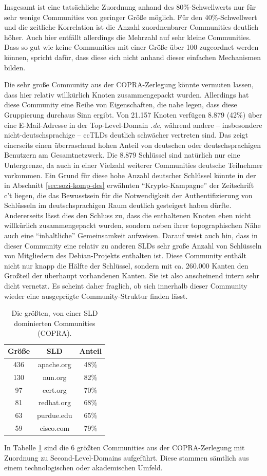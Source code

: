 Insgesamt ist eine tatsächliche Zuordnung anhand des
80\%-Schwellwerts nur für sehr wenige Communities von geringer
Größe möglich. Für den 40\%-Schwellwert und die zeitliche
Korrelation ist die Anzahl zuordnenbarer Communities deutlich
höher. Auch hier entfällt allerdings die Mehrzahl auf sehr kleine
Communities.  Dass so gut wie keine Communities mit einer Größe
über 100 zugeordnet werden können, spricht dafür, dass diese
sich nicht anhand dieser einfachen Mechanismen bilden.

Die sehr große Community aus der COPRA-Zerlegung könnte vermuten
lassen, dass hier relativ willkürlich Knoten zusammengepackt
wurden. Allerdings hat diese Community eine Reihe von Eigenschaften,
die nahe legen, dass diese Gruppierung durchaus Sinn ergibt. Von 21.157
Knoten verfügen 8.879 (42\%) über eine E-Mail-Adresse in der
Top-Level-Domain \emph{.de}, während andere -- insbesondere
nicht-deutschsprachige -- ccTLDs deutlich schwächer vertreten
sind. Das zeigt einerseits einen überraschend hohen Anteil von
deutschen oder deutschsprachigen Benutzern am Gesamtnetzwerk. Die 8.879
Schlüssel sind natürlich nur eine Untergrenze, da auch in einer
Vielzahl weiterer Communities deutsche Teilnehmer vorkommen. Ein Grund
für diese hohe Anzahl deutscher Schlüssel könnte in der in
Abschnitt \ref{sec:sozi-komp-des} erwähnten ``Krypto-Kampagne'' der
Zeitschrift c't liegen, die das Bewusstsein für die Notwendigkeit
der Authentifizierung von Schlüsseln im deutschsprachigen Raum
deutlich gesteigert haben dürfte. Andererseits lässt dies den
Schluss zu, dass die enthaltenen Knoten eben nicht willkürlich
zusammengepackt wurden, sondern neben ihrer topographischen Nähe
auch eine ``inhaltliche'' Gemeinsamkeit aufweisen. Darauf weist auch
hin, dass in dieser Community eine relativ zu anderen SLDs sehr große
Anzahl von Schlüsseln von Mitgliedern des Debian-Projekts enthalten
ist. Diese Community enthält nicht nur knapp die Hälfte der
Schlüssel, sondern mit ca. 260.000 Kanten den Großteil der
überhaupt vorhandenen Kanten. Sie ist also anscheinend intern sehr
dicht vernetzt. Es scheint daher fraglich, ob sich innerhalb dieser
Community wieder eine ausgeprägte Community-Struktur finden lässt.

\begin{table}
  \centering
  \begin{tabular}{c|c|c}
    Größe & SLD & Anteil \\
    \hline
    436 & apache.org & 48\% \\
    130 & nun.org & 82\% \\
    97 & cert.org & 70\% \\
    81 & redhat.org & 68\% \\
    63 & purdue.edu & 65\% \\
    59 & cisco.com & 79\% 
  \end{tabular}
  \caption{Die größten, von einer SLD dominierten Communities
    (COPRA).}
  \label{tab:ass-examples}
\end{table}
In Tabelle \ref{tab:ass-examples} sind die 6 größten Communities
aus der COPRA-Zerlegung mit Zuordnung zu Second-Level-Domains
aufgeführt. Diese stammen sämtlich aus einem technologischen oder
akademischen Umfeld.

